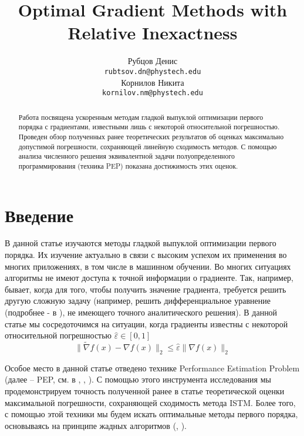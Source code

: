 \documentclass{article}
\title{Optimal Gradient Methods with Relative Inexactness}
\author{
	Рубцов Денис \\
	\texttt{rubtsov.dn@phystech.edu} \\
	\And
	Корнилов Никита \\
	\texttt{kornilov.nm@phystech.edu} \\
}
\date{}
\begin{document}
\maketitle

\begin{abstract}
Работа посвящена ускоренным методам гладкой выпуклой оптимизации первого порядка с градиентами, известными лишь с некоторой относительной погрешностью. Проведен обзор полученных ранее теоретических результатов об оценках максимально допустимой погрешности, сохраняющей линейную сходимость методов. С помощью анализа численного решения эквивалентной задачи полуопределенного программирования (техника PEP) показана достижимость этих оценок.

\end{abstract}



\section{\textbf{Введение}}

В данной статье изучаются методы гладкой выпуклой оптимизации первого порядка. Их изучение актуально в связи с высоким успехом их применения во многих приложениях, в том числе в машинном обучении. Во многих ситуациях алгоритмы не имеют доступа к точной информации о градиенте. Так, например, бывает, когда для того, чтобы получить значение градиента, требуется решить другую сложную задачу (например, решить дифференциальное уравнение (подробнее - в \cite{matyukhin2021convex}), не имеющего точного аналитического решения). В данной статье мы сосредоточимся на ситуации, когда градиенты известны с некоторой относительной погрешностью $\hat{\varepsilon} \in [0, 1]$ $$\|\widetilde{\nabla} f(x) - \nabla f(x)\|_2 \leq \hat{\varepsilon} \|\nabla f(x)\|_2$$

Особое место в данной статье отведено технике Performance Estimation Problem (далее -- PEP, см. в \cite{goujaud2022pepit}, \cite{taylor2017smooth}, \cite{taylor2017convex}). С помощью этого инструмента исследования мы продемонстрируем точность полученной ранее в статье \cite{kornilov2023intermediate} теоретической оценки максимальной погрешности, сохраняющей сходимость метода ISTM. Более того, с помощью этой техники мы будем искать оптимальные методы первого порядка, основываясь на принципе жадных алгоритмов (\cite{goujaud2023fundamental}, \cite{kim2018generalizing}). 
\end{document}
